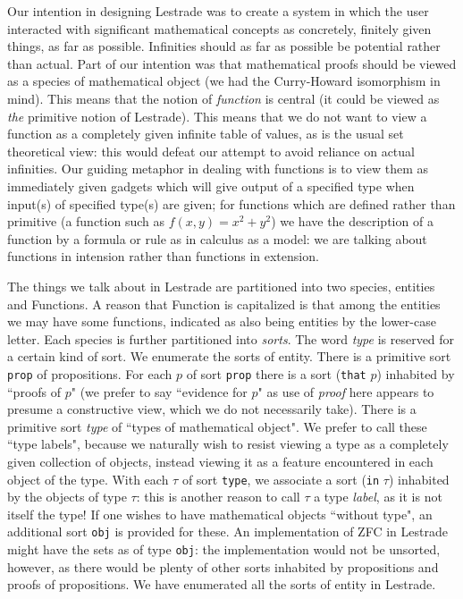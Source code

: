 \documentclass{article}
\begin{document}
 Our intention in designing Lestrade was to create a system in which the user interacted with significant mathematical concepts as concretely, finitely given things, as far as possible.  Infinities should as far as possible be potential rather than actual.  Part of our intention was that mathematical proofs should be viewed as a species of mathematical object (we had the Curry-Howard isomorphism in mind).  This means that the notion of {\em function\/} is central (it could be viewed as {\em the\/} primitive notion of Lestrade).  This means that we do not want to view a function as a completely given infinite table of values, as is the usual set theoretical view:  this would defeat our attempt to avoid reliance on actual infinities.  Our guiding metaphor in dealing with functions is to view them as immediately given gadgets which will give output of a specified type when input(s) of specified type(s) are given;  for functions which are defined rather than primitive (a function such as $f(x,y)=x^2+y^2$) we have the description of a function by a formula or rule as in calculus as a model:  we are talking about functions in intension rather than functions in extension.

The things we talk about in Lestrade are partitioned into two species, entities and Functions.  A reason that Function is capitalized is that among the entities we may have some functions, indicated as also being entities by the lower-case letter.  Each species is further partitioned into {\em sorts\/}.  The word {\em type\/} is reserved for a certain kind of sort.  We enumerate the sorts of entity.  There is a primitive sort {\tt prop} of propositions.  For each $p$ of sort
{\tt prop} there is a sort ({\tt that} $p$) inhabited by ``proofs of $p$" (we prefer to say ``evidence for $p$" as use of {\em proof\/} here appears to presume a constructive view, which we do not necessarily take).  There is a primitive sort {\em type\/} of ``types of mathematical object".  We prefer to call these ``type labels", because we naturally wish to resist viewing a type as a completely given collection of objects, instead viewing it as a feature encountered in each object of the type.  With each $\tau$ of sort {\tt type}, we associate a sort ({\tt in} $\tau$) inhabited by the objects of type $\tau$:  this is another reason to call $\tau$ a type {\em label\/}, as it is not itself the type!  If one wishes to have mathematical objects ``without type", an additional sort {\tt obj} is provided for these.  An implementation of ZFC in Lestrade might have the sets as of type {\tt obj}:  the implementation would not be unsorted, however, as there would be plenty of other sorts inhabited by propositions and proofs of propositions.  We have enumerated all the sorts of entity in Lestrade.
\end{document}
